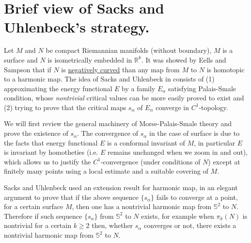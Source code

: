 \iffalse
\begin{info}
The PDF version of this page can be downloaded by replacing \texttt{html} in the its address by
\texttt{pdf}. 
For example \texttt{/html/sheaf-cohomology.html} should become \texttt{/pdf/sheaf-cohomology.pdf}.
\end{info}
\fi

\iffalse
This post is my reading note for \cite{sacks_existence_1981}. I want to present the authors'
ideas as clear as possible and I may probably skip a few (important) details and computations.
\fi

\section{Brief view of Sacks and Uhlenbeck's strategy.}
\label{sec:org39dd5c6}

Let \(M\) and \(N\) be compact Riemannian manifolds (without boundary), \(M\) is a
surface and \(N\) is isometrically embedded in \(\mathbb{R}^k\). It was showed by
Eells and Sampson \cite{eells_harmonic_1964} that if \(N\) is \href{harmonic-map-existence.org}{negatively curved} than any
map from \(M\) to \(N\) is homotopic to a harmonic map. The idea of Sacks and
Uhlenbeck in \cite{sacks_existence_1981} consists of (1) approximating the energy functional
\(E\) by a family \(E_\alpha\) satisfying Palais-Smale condition, whose
\emph{nontrivial} critical values can be more easily proved to exist and (2) trying to prove
that the critical maps \(s_\alpha\) of \(E_\alpha\) converge in \(C^1\)-topology.

We will first review the general machinery of Morse-Palais-Smale theory and prove the existence
of \(s_\alpha\). The convergence of \(s_\alpha\) in the case of surface is due to the
facts that energy functional \(E\) is a conformal invariant of \(M\), in particular \(E\) is
invariant by homotheties (i.e.  \(E\) remains unchanged when we zoom in and out), which
allows us to justify the \(C^1\)-convergence (under conditions of \(N\)) except at
finitely many points using a local estimate and a suitable
covering of \(M\). 

Sacks and Uhlenbeck used an extension result for harmonic map, in an elegant argument
to prove that if the above sequence \(\{s_\alpha\}\) fails to converge at a point,
for a certain surface \(M\), then one has a nontrivial harmonic map from \(\mathbb{S}^2\) to \(N\). Therefore if such sequence \(\{ s_\alpha \}\) from \(\mathbb{S}^2\) to \(N\) exists, for example when \(\pi_k (N)\) is nontrivial for a certain \(k\geq 2\) then, 
whether \(s_\alpha\) converges or not, there exists a nontrivial harmonic map from \(\mathbb{S}^2\) to \(N\). 

